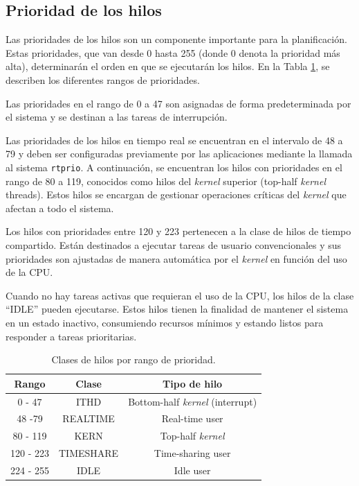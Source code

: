 \subsection{Prioridad de los hilos}

Las prioridades de los hilos son un componente importante para la planificación. Estas prioridades, que van desde 0 hasta 255 (donde 0 denota la prioridad más alta), determinarán el orden en que se ejecutarán los hilos. En la Tabla \ref{tabla:prio-hilos}, se describen los diferentes rangos de prioridades.

Las prioridades en el rango de 0 a 47 son asignadas de forma predeterminada por el sistema y se destinan a las tareas de interrupción.\par

Las prioridades de los hilos en tiempo real se encuentran en el intervalo de 48 a 79 y deben ser configuradas previamente por las aplicaciones mediante la llamada al sistema \texttt{rtprio}. A continuación, se encuentran los hilos con prioridades en el rango de 80 a 119, conocidos como hilos del \textit{kernel} superior (top-half \textit{kernel} threads). Estos hilos se encargan de gestionar operaciones críticas del \textit{kernel} que afectan a todo el sistema.\par

Los hilos con prioridades entre 120 y 223 pertenecen a la clase de hilos de tiempo compartido. Están destinados a ejecutar tareas de usuario convencionales y sus prioridades son ajustadas de manera automática por el \textit{kernel} en función del uso de la CPU.\par

Cuando no hay tareas activas que requieran el uso de la CPU, los hilos de la clase ``IDLE'' pueden ejecutarse. Estos hilos tienen la finalidad de mantener el sistema en un estado inactivo, consumiendo recursos mínimos y estando listos para responder a tareas prioritarias.\par

\begin{table}[H]
    \centering
    \begin{tabular}{|c|c|c|}
        \hline
        \textbf{Rango} & \textbf{Clase} & \textbf{Tipo de hilo}          \\
        \hline
        0 - 47         & ITHD           & Bottom-half \textit{kernel} (interrupt) \\
        \hline
        48 -79         & REALTIME       & Real-time user                 \\
        \hline
        80 - 119       & KERN           & Top-half \textit{kernel}                \\
        \hline
        120 - 223      & TIMESHARE      & Time-sharing user              \\
        \hline
        224 - 255      & IDLE           & Idle user                      \\
        \hline
    \end{tabular}
    \caption{Clases de hilos por rango de prioridad.}
    \label{tabla:prio-hilos}
\end{table}


